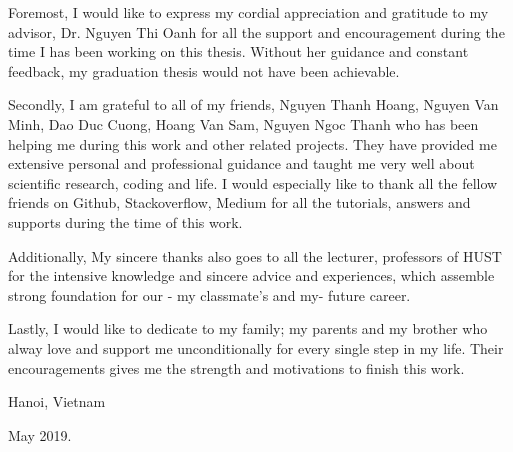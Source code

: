 \begin{acknowledgement}
\hspace{0.5cm}Foremost, I would like to express my cordial appreciation and gratitude to my advisor, 
Dr. Nguyen Thi Oanh for all the support and encouragement during the time I has been working on this thesis. 
Without her guidance and constant feedback, my graduation thesis would not have been
achievable.\par
Secondly, I am grateful to all of my friends, Nguyen Thanh Hoang, Nguyen Van Minh, Dao Duc Cuong, Hoang Van Sam, Nguyen Ngoc Thanh 
 who has been helping me during this work and other related projects.
They have provided me extensive personal and professional guidance and taught me very well about scientific research, coding and life.
I would especially like to thank all the fellow friends on Github, Stackoverflow, Medium for all the tutorials, answers and supports during the time
of this work.\par
Additionally, My sincere thanks also goes to all the lecturer, professors of HUST for the intensive knowledge and sincere
advice and experiences, which assemble strong foundation for our - my classmate's and my- future career.\par 

Lastly, I would like to dedicate to my family; my parents and my brother who alway love and support me unconditionally for
every single step in my life. Their encouragements gives me the strength and motivations to finish this work.\par
Hanoi, Vietnam\par
May 2019.





\end{acknowledgement}